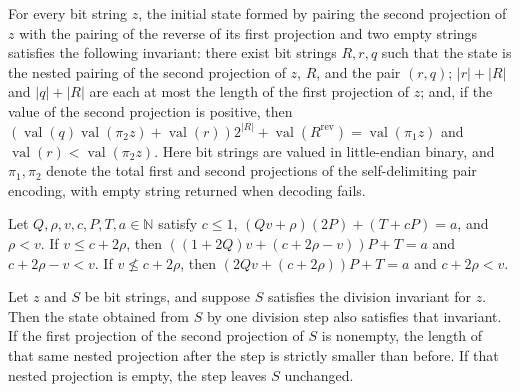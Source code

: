 \begin{theorem}
\label{Complexity.BinArith.divInv_init}
\leanok
{}
For every bit string $z$, the initial state formed by pairing the second projection of
$z$ with the pairing of the reverse of its first projection and two empty strings
satisfies the following invariant: there exist bit strings $R,r,q$ such that the state
is the nested pairing of the second projection of $z$, $R$, and the pair $(r,q)$;
$|r|+|R|$ and $|q|+|R|$ are each at most the length of the first projection of $z$; and,
if the value of the second projection is positive, then
$(\operatorname{val}(q)\operatorname{val}(\pi_2
z)+\operatorname{val}(r))2^{|R|}+\operatorname{val}(R^{\mathrm{rev}})=\operatorname{val}(\pi_1
z)$ and $\operatorname{val}(r)<\operatorname{val}(\pi_2 z)$. Here bit strings are valued
in little-endian binary, and $\pi_1,\pi_2$ denote the total first and second projections
of the self-delimiting pair encoding, with empty string returned when decoding fails.
\end{theorem}

\begin{theorem}
\label{Complexity.BinArith.div_value_step}
\leanok
{}
Let $Q,\rho,v,c,P,T,a\in\mathbb N$ satisfy $c\le1$, $(Qv+\rho)(2P)+(T+cP)=a$, and
$\rho<v$. If $v\le c+2\rho$, then $((1+2Q)v+(c+2\rho-v))P+T=a$ and $c+2\rho-v<v$. If
$v\nleq c+2\rho$, then $(2Qv+(c+2\rho))P+T=a$ and $c+2\rho<v$.
\end{theorem}

\begin{theorem}
\label{Complexity.BinArith.divInv_step}
\leanok
{}
Let $z$ and $S$ be bit strings, and suppose $S$ satisfies the division invariant for
$z$. Then the state obtained from $S$ by one division step also satisfies that
invariant. If the first projection of the second projection of $S$ is nonempty, the
length of that same nested projection after the step is strictly smaller than before. If
that nested projection is empty, the step leaves $S$ unchanged.
\end{theorem}

